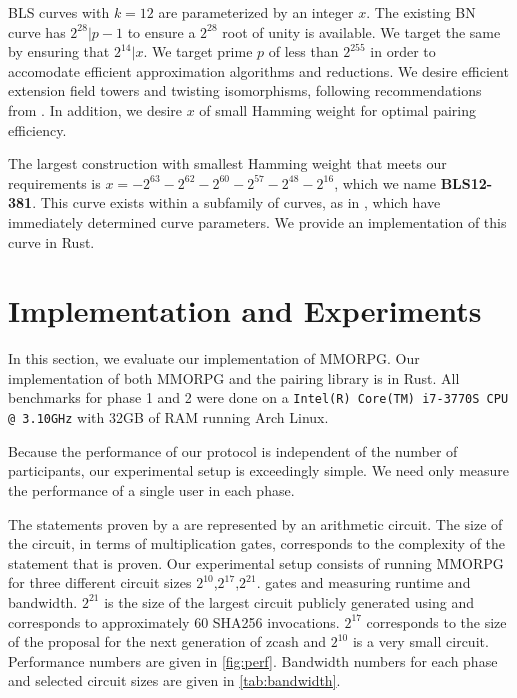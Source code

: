 \documentclass{article}
\begin{document}
BLS curves with $k = 12$ are parameterized by an integer $x$. The existing BN curve has $2^{28} | p - 1$ to ensure a $2^{28}$ root of unity is available. We target the same by ensuring that $2^{14} | x$. We target prime $p$ of less than $2^{255}$ in order to accomodate efficient approximation algorithms and reductions. We desire efficient extension field towers and twisting isomorphisms, following recommendations from \cite{cryptoeprint:2012:232}. In addition, we desire $x$ of small Hamming weight for optimal pairing efficiency.

The largest construction with smallest Hamming weight that meets our requirements is $x = -2^{63} - 2^{62} - 2^{60} - 2^{57} - 2^{48} - 2^{16}$, which we name \textbf{BLS12-381}. This curve exists within a subfamily of curves, as in \cite{cryptoeprint:2011:465}, which have immediately determined curve parameters. We provide an implementation of this curve in Rust. \cite{pairinglibrary}


\newcommand{\circuitsmall}{$2^{10}$}
\newcommand{\circuitmedium}{$2^{17}$}
\newcommand{\circuitlarge}{$2^{21}$}
\section{Implementation and Experiments}
\label{sec:perf}
In this section, we evaluate our implementation of MMORPG. Our implementation of both MMORPG and the pairing library is in Rust. All benchmarks for phase 1 and 2  were done on a \texttt{Intel(R) Core(TM) i7-3770S CPU @ 3.10GHz} with 32GB of RAM running Arch Linux.


Because the performance of our protocol is independent of the number of participants, our experimental setup is exceedingly simple.  We need only measure the performance of a single user in each phase. 

The statements proven by a {\snarks} are represented by an arithmetic circuit. The size of the circuit, in terms of multiplication gates,  corresponds to the complexity of the statement that is proven. Our experimental setup consists of running MMORPG  for three different circuit sizes {\circuitsmall},{\circuitmedium},{\circuitlarge.} gates and measuring runtime and bandwidth.  {\circuitlarge} is the size of  the largest circuit publicly generated using\cite{BGG17} and corresponds to approximately 60 SHA256 invocations.  {\circuitmedium} corresponds to the size of the proposal for the next generation of zcash\cite{sapling} and {\circuitsmall} is a very small circuit. Performance numbers are given in \cref{fig:perf}. Bandwidth numbers for each phase and selected circuit sizes are given in \cref{tab:bandwidth}.
\end{document}
